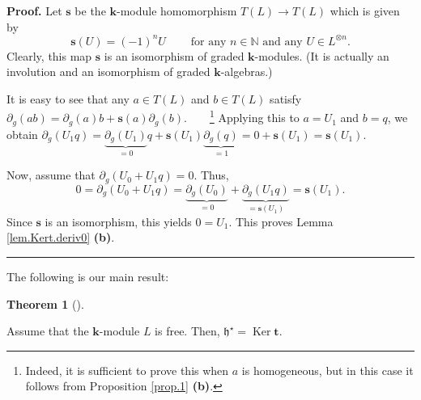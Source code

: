 \documentclass[numbers=enddot,12pt,final,onecolumn,notitlepage]{scrartcl}%
\theoremstyle{definition}
\newtheorem{theo}{Theorem}[section]
\newenvironment{theorem}[1][]
{\begin{theo}[#1]\begin{leftbar}}
{\end{leftbar}\end{theo}}
\newenvironment{proof}[1][Proof]{\noindent\textbf{#1.} }{\ \rule{0.5em}{0.5em}}
\begin{document}
\begin{proof}
Let $\mathbf{s}$ be the $\mathbf{k}$-module homomorphism $T\left(  L\right)
\to T\left(  L\right)  $ which is given by
\[
\mathbf{s}\left(  U\right)  = \left(  -1\right)  ^{n} U
\ \ \ \ \ \ \ \ \ \ \text{for any } n \in\mathbb{N} \text{ and any } U \in
L^{\otimes n} .
\]
Clearly, this map $\mathbf{s}$ is an isomorphism of graded $\mathbf{k}%
$-modules. (It is actually an involution and an isomorphism of graded
$\mathbf{k}$-algebras.)

It is easy to see that any $a\in T\left(  L\right)  $ and $b\in T\left(
L\right)  $ satisfy $\partial_{g}\left(  ab\right)  =\partial_{g}\left(
a\right)  b+\mathbf{s}\left(  a\right)  \partial_{g}\left(  b\right)
$.\ \ \ \ \footnote{Indeed, it is sufficient to prove this when $a$ is
homogeneous, but in this case it follows from Proposition \ref{prop.1}
\textbf{(b)}.} Applying this to $a=U_{1}$ and $b=q$, we obtain $\partial
_{g}\left(  U_{1}q\right)  =\underbrace{\partial_{g}\left(  U_{1}\right)
}_{=0}q+\mathbf{s}\left(  U_{1}\right)  \underbrace{\partial_{g}\left(
q\right)  }_{=1}=0+\mathbf{s}\left(  U_{1}\right)  =\mathbf{s}\left(
U_{1}\right)  $.

Now, assume that $\partial_{g}\left(  U_{0}+U_{1}q\right)  =0$. Thus,
\[
0=\partial_{g}\left(  U_{0}+U_{1}q\right)  =\underbrace{\partial_{g}\left(
U_{0}\right)  }_{=0}+\underbrace{\partial_{g}\left(  U_{1}q\right)
}_{=\mathbf{s}\left(  U_{1}\right)  }=\mathbf{s}\left(  U_{1}\right)  .
\]
Since $\mathbf{s}$ is an isomorphism, this yields $0=U_{1}$. This proves Lemma
\ref{lem.Kert.deriv0} \textbf{(b)}.
\end{proof}

The following is our main result:

\begin{theorem}
\label{thm.Kert}Assume that the $\mathbf{k}$-module $L$ is free. Then,
$\mathfrak{h}^{\star}=\operatorname*{Ker}\mathbf{t}$.
\end{theorem}
\end{document}
